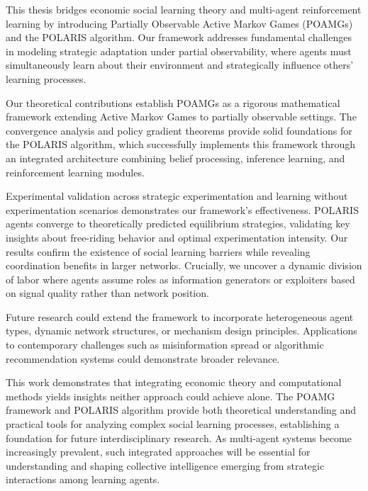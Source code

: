 This thesis bridges economic social learning theory and multi-agent reinforcement learning by introducing Partially Observable Active Markov Games (POAMGs) and the POLARIS algorithm. Our framework addresses fundamental challenges in modeling strategic adaptation under partial observability, where agents must simultaneously learn about their environment and strategically influence others' learning processes.

Our theoretical contributions establish POAMGs as a rigorous mathematical framework extending Active Markov Games to partially observable settings. The convergence analysis and policy gradient theorems provide solid foundations for the POLARIS algorithm, which successfully implements this framework through an integrated architecture combining belief processing, inference learning, and reinforcement learning modules.

Experimental validation across strategic experimentation and learning without experimentation scenarios demonstrates our framework's effectiveness. POLARIS agents converge to theoretically predicted equilibrium strategies, validating key insights about free-riding behavior and optimal experimentation intensity. Our results confirm the existence of social learning barriers while revealing coordination benefits in larger networks. Crucially, we uncover a dynamic division of labor where agents assume roles as information generators or exploiters based on signal quality rather than network position.

Future research could extend the framework to incorporate heterogeneous agent types, dynamic network structures, or mechanism design principles. Applications to contemporary challenges such as misinformation spread or algorithmic recommendation systems could demonstrate broader relevance.

This work demonstrates that integrating economic theory and computational methods yields insights neither approach could achieve alone. The POAMG framework and POLARIS algorithm provide both theoretical understanding and practical tools for analyzing complex social learning processes, establishing a foundation for future interdisciplinary research. As multi-agent systems become increasingly prevalent, such integrated approaches will be essential for understanding and shaping collective intelligence emerging from strategic interactions among learning agents.
